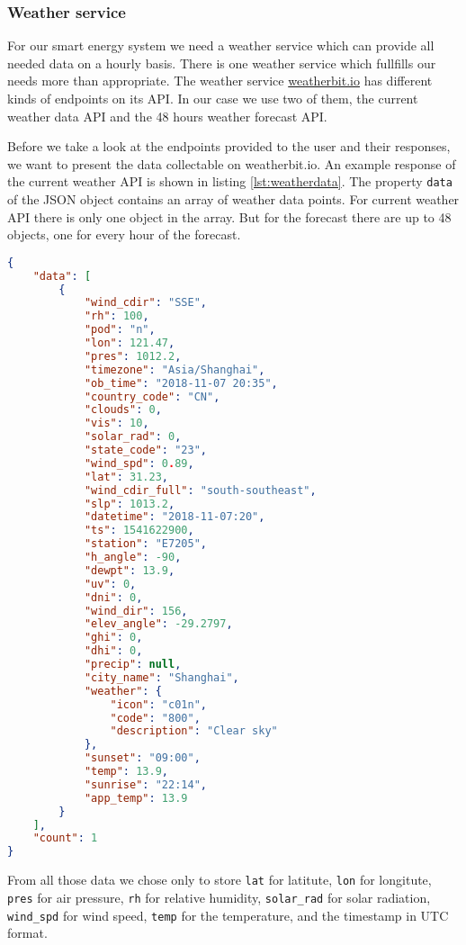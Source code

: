 \subsubsection{Weather service}\label{sec:weatherservice}
For our smart energy system we need a weather service which can provide all needed data on a hourly basis.
There is one weather service which fullfills our needs more than appropriate.
The weather service \url{weatherbit.io} has different kinds of endpoints on its API.
In our case we use two of them, the current weather data API and the 48 hours weather forecast API.

Before we take a look at the endpoints provided to the user and their responses, we want to present the data collectable on weatherbit.io.
An example response of the current weather API is shown in listing \ref{lst:weatherdata}.
The property  \texttt{data} of the JSON object contains an array of weather data points.
For current weather API there is only one object in the array.
But for the forecast there are up to 48 objects, one for every hour of the forecast.
\begin{lstlisting}[caption={Example response of weatherbit.io for $lat=31.23$ and $lon=121.47$}, label={lst:weatherdata}, frame=single, language=json]
 {
    "data": [
        {
            "wind_cdir": "SSE",
            "rh": 100,
            "pod": "n",
            "lon": 121.47,
            "pres": 1012.2,
            "timezone": "Asia/Shanghai",
            "ob_time": "2018-11-07 20:35",
            "country_code": "CN",
            "clouds": 0,
            "vis": 10,
            "solar_rad": 0,
            "state_code": "23",
            "wind_spd": 0.89,
            "lat": 31.23,
            "wind_cdir_full": "south-southeast",
            "slp": 1013.2,
            "datetime": "2018-11-07:20",
            "ts": 1541622900,
            "station": "E7205",
            "h_angle": -90,
            "dewpt": 13.9,
            "uv": 0,
            "dni": 0,
            "wind_dir": 156,
            "elev_angle": -29.2797,
            "ghi": 0,
            "dhi": 0,
            "precip": null,
            "city_name": "Shanghai",
            "weather": {
                "icon": "c01n",
                "code": "800",
                "description": "Clear sky"
            },
            "sunset": "09:00",
            "temp": 13.9,
            "sunrise": "22:14",
            "app_temp": 13.9
        }
    ],
    "count": 1
}
\end{lstlisting}
From all those data we chose only to store \texttt{lat} for latitute, \texttt{lon} for longitute, \texttt{pres} for air pressure, \texttt{rh} for relative humidity, \texttt{solar\_rad} for solar radiation, \texttt{wind\_spd} for wind speed, \texttt{temp} for the temperature, and the timestamp in UTC format.

